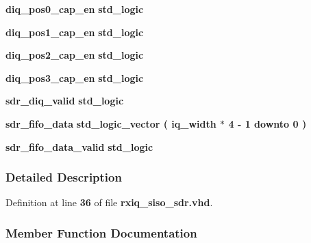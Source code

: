 \begin{DoxyCompactItemize}
\item 
{\bf diq\+\_\+pos0\+\_\+cap\+\_\+en} {\bfseries \textcolor{comment}{std\+\_\+logic}\textcolor{vhdlchar}{ }} 
\item 
{\bf diq\+\_\+pos1\+\_\+cap\+\_\+en} {\bfseries \textcolor{comment}{std\+\_\+logic}\textcolor{vhdlchar}{ }} 
\item 
{\bf diq\+\_\+pos2\+\_\+cap\+\_\+en} {\bfseries \textcolor{comment}{std\+\_\+logic}\textcolor{vhdlchar}{ }} 
\item 
{\bf diq\+\_\+pos3\+\_\+cap\+\_\+en} {\bfseries \textcolor{comment}{std\+\_\+logic}\textcolor{vhdlchar}{ }} 
\item 
{\bf sdr\+\_\+diq\+\_\+valid} {\bfseries \textcolor{comment}{std\+\_\+logic}\textcolor{vhdlchar}{ }} 
\item 
{\bf sdr\+\_\+fifo\+\_\+data} {\bfseries \textcolor{comment}{std\+\_\+logic\+\_\+vector}\textcolor{vhdlchar}{ }\textcolor{vhdlchar}{(}\textcolor{vhdlchar}{ }\textcolor{vhdlchar}{ }\textcolor{vhdlchar}{ }\textcolor{vhdlchar}{ }{\bfseries {\bf iq\+\_\+width}} \textcolor{vhdlchar}{$\ast$}\textcolor{vhdlchar}{ } \textcolor{vhdldigit}{4} \textcolor{vhdlchar}{-\/}\textcolor{vhdlchar}{ } \textcolor{vhdldigit}{1} \textcolor{vhdlchar}{ }\textcolor{keywordflow}{downto}\textcolor{vhdlchar}{ }\textcolor{vhdlchar}{ } \textcolor{vhdldigit}{0} \textcolor{vhdlchar}{ }\textcolor{vhdlchar}{)}\textcolor{vhdlchar}{ }} 
\item 
{\bf sdr\+\_\+fifo\+\_\+data\+\_\+valid} {\bfseries \textcolor{comment}{std\+\_\+logic}\textcolor{vhdlchar}{ }} 
\end{DoxyCompactItemize}


\subsubsection{Detailed Description}


Definition at line {\bf 36} of file {\bf rxiq\+\_\+siso\+\_\+sdr.\+vhd}.



\subsubsection{Member Function Documentation}

